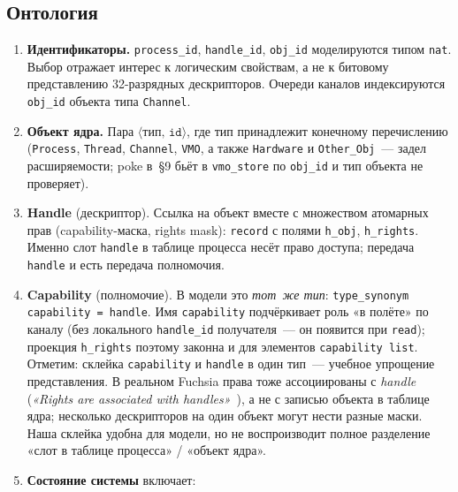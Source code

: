 \documentclass[11pt,a4paper]{article}
\begin{document}
\subsection{Онтология}

\begin{enumerate}[leftmargin=1.6em,label=\arabic*.,ref=\arabic*]
	\item \textbf{Идентификаторы.}
	      \texttt{process\_id}, \texttt{handle\_id}, \texttt{obj\_id}
	      моделируются типом \texttt{nat}. Выбор отражает интерес к логическим
	      свойствам, а не к битовому представлению 32-разрядных дескрипторов.
	      Очереди каналов индексируются \texttt{obj\_id} объекта типа
	      \texttt{Channel}.
	\item \textbf{Объект ядра.}
	      Пара $\langle\texttt{тип},\,\texttt{id}\rangle$, где тип принадлежит
	      конечному перечислению
	      (\texttt{Process}, \texttt{Thread}, \texttt{Channel}, \texttt{VMO},
	      а также \texttt{Hardware} и \texttt{Other\_Obj}~--- задел
	      расширяемости; poke в~§9 бьёт в \texttt{vmo\_store} по
	      \texttt{obj\_id} и тип объекта не проверяет).
	\item \textbf{Handle} (дескриптор).
	      Ссылка на объект вместе с множеством атомарных прав
	      (\textenglish{capability-маска}, rights mask): \texttt{record} с
	      полями \texttt{h\_obj}, \texttt{h\_rights}. Именно слот
	      \texttt{handle} в таблице процесса несёт право доступа; передача
	      \texttt{handle} и есть передача полномочия.
	\item \textbf{Capability} (полномочие).
	      В модели это \emph{тот~же тип}:
	      \texttt{type\_synonym capability = handle}. Имя
	      \texttt{capability} подчёркивает роль «в полёте» по каналу
	      (без локального \texttt{handle\_id} получателя~--- он появится при
	      \texttt{read}); проекция \texttt{h\_rights} поэтому законна и для
	      элементов \texttt{capability list}.
	      Отметим: склейка \texttt{capability} и \texttt{handle} в один
	      тип~--- учебное упрощение представления. В реальном Fuchsia
	      права тоже ассоциированы с \emph{handle}
	      (\emph{«Rights are associated with handles»}~\cite{zircon_rights}),
	      а не с записью объекта в таблице ядра; несколько дескрипторов
	      на один объект могут нести разные маски. Наша склейка удобна
	      для модели, но не воспроизводит полное разделение «слот в
	      таблице процесса» / «объект ядра».
	\item \textbf{Состояние системы} включает:
	      \begin{enumerate}[leftmargin=1.4em,label=\alph*)]

\end{enumerate}
\end{enumerate}
\end{document}
